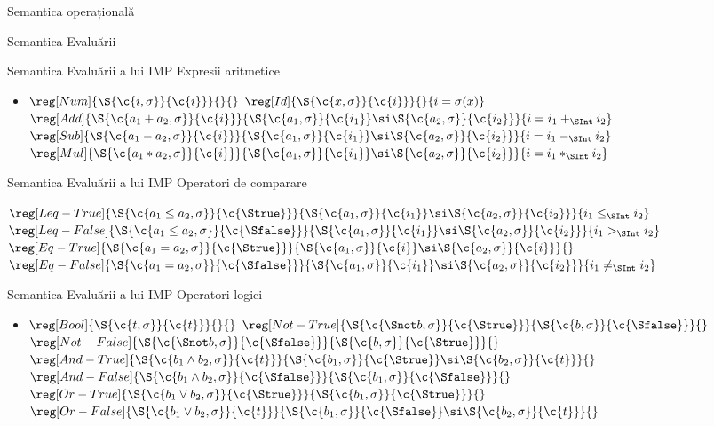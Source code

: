 \documentclass[xcolor=pdftex,romanian,colorlinks]{beamer}
\begin{document}
\begin{section}{Semantica operațională}
\begin{subsection}{Semantica Evaluării}
\begin{frame}{Semantica Evaluării a lui IMP}
{Expresii aritmetice}
\begin{itemize}
\item[] $\reg[Num]{\S{\c{i,\sigma}}{\c{i}}}{}{}$
\vitem[] $\reg[Id]{\S{\c{x,\sigma}}{\c{i}}}{}{i = \sigma(x)}$
\vitem[] $\reg[Add]{\S{\c{a_1 + a_2,\sigma}}{\c{i}}}{\S{\c{a_1,\sigma}}{\c{i_1}}\si\S{\c{a_2,\sigma}}{\c{i_2}}}{i = i_1 +_{\SInt} i_2}$
\vitem[] $\reg[Sub]{\S{\c{a_1 - a_2,\sigma}}{\c{i}}}{\S{\c{a_1,\sigma}}{\c{i_1}}\si\S{\c{a_2,\sigma}}{\c{i_2}}}{i = i_1 -_{\SInt} i_2}$
\vitem[] $\reg[Mul]{\S{\c{a_1 * a_2,\sigma}}{\c{i}}}{\S{\c{a_1,\sigma}}{\c{i_1}}\si\S{\c{a_2,\sigma}}{\c{i_2}}}{i = i_1 *_{\SInt} i_2}$
\end{itemize}
\end{frame}
\begin{frame}{Semantica Evaluării a lui IMP}
{Operatori de comparare}
\begin{itemize}
\vitem[] $\reg[Leq-True]{\S{\c{a_1 \leq a_2,\sigma}}{\c{\Strue}}}{\S{\c{a_1,\sigma}}{\c{i_1}}\si\S{\c{a_2,\sigma}}{\c{i_2}}}{i_1 \leq_{\SInt} i_2}$
\vitem[] $\reg[Leq-False]{\S{\c{a_1 \leq a_2,\sigma}}{\c{\Sfalse}}}{\S{\c{a_1,\sigma}}{\c{i_1}}\si\S{\c{a_2,\sigma}}{\c{i_2}}}{i_1 >_{\SInt} i_2}$
\vitem[] $\reg[Eq-True]{\S{\c{a_1 = a_2,\sigma}}{\c{\Strue}}}{\S{\c{a_1,\sigma}}{\c{i}}\si\S{\c{a_2,\sigma}}{\c{i}}}{}$
\vitem[] $\reg[Eq-False]{\S{\c{a_1 = a_2,\sigma}}{\c{\Sfalse}}}{\S{\c{a_1,\sigma}}{\c{i_1}}\si\S{\c{a_2,\sigma}}{\c{i_2}}}{i_1 \neq_{\SInt} i_2}$
\end{itemize}
\end{frame}
\begin{frame}{Semantica Evaluării a lui IMP}
{Operatori logici}
\begin{itemize}
\item[] $\reg[Bool]{\S{\c{t,\sigma}}{\c{t}}}{}{}$
\vitem[] $\reg[Not-True]{\S{\c{\Snot b,\sigma}}{\c{\Strue}}}{\S{\c{b,\sigma}}{\c{\Sfalse}}}{}$
\hfill
$\reg[Not-False]{\S{\c{\Snot b,\sigma}}{\c{\Sfalse}}}{\S{\c{b,\sigma}}{\c{\Strue}}}{}$
\vitem[] $\reg[And-True]{\S{\c{b_1 \wedge b_2,\sigma}}{\c{t}}}{\S{\c{b_1,\sigma}}{\c{\Strue}}\si\S{\c{b_2,\sigma}}{\c{t}}}{}$
\vitem[] $\reg[And-False]{\S{\c{b_1 \wedge b_2,\sigma}}{\c{\Sfalse}}}{\S{\c{b_1,\sigma}}{\c{\Sfalse}}}{}$
\vitem[] $\reg[Or-True]{\S{\c{b_1 \vee b_2,\sigma}}{\c{\Strue}}}{\S{\c{b_1,\sigma}}{\c{\Strue}}}{}$
\vitem[] $\reg[Or-False]{\S{\c{b_1 \vee b_2,\sigma}}{\c{t}}}{\S{\c{b_1,\sigma}}{\c{\Sfalse}}\si\S{\c{b_2,\sigma}}{\c{t}}}{}$
\end{itemize}

\end{frame}
\end{subsection}
\end{section}
\end{document}

